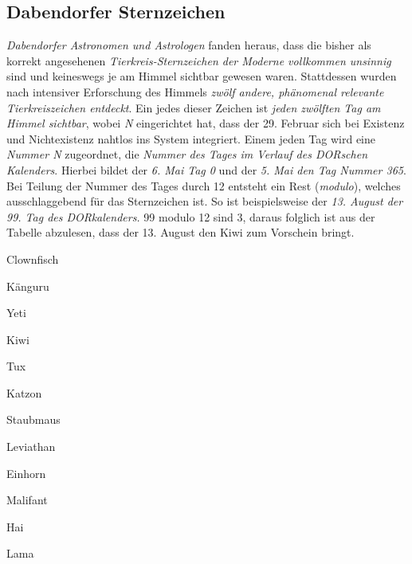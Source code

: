 \subsection{{Dabendorfer Sternzeichen}}
\textit{Dabendorfer Astronomen und Astrologen} fanden heraus, dass die bisher als korrekt angesehenen \textit{Tierkreis-Sternzeichen der Moderne vollkommen unsinnig} sind und keineswegs je am Himmel sichtbar gewesen waren. Stattdessen wurden nach intensiver Erforschung des Himmels \textit{zwölf andere, phänomenal relevante Tierkreiszeichen entdeckt}. Ein jedes dieser Zeichen ist \textit{jeden zwölften Tag am Himmel sichtbar}, wobei \textit{N} eingerichtet hat, dass der 29. Februar sich bei Existenz und Nichtexistenz nahtlos ins System integriert. Einem jeden Tag wird eine \textit{Nummer N} zugeordnet, die \textit{Nummer des Tages im Verlauf des DORschen Kalenders}. Hierbei bildet der \textit{6. Mai Tag 0} und der \textit{5. Mai den Tag Nummer 365}. Bei Teilung der Nummer des Tages durch 12 entsteht ein Rest (\textit{modulo}), welches ausschlaggebend für das Sternzeichen ist. So ist beispielsweise der \textit{13. August der 99. Tag des DORkalenders.} 99 modulo 12 sind 3, daraus folglich ist aus der Tabelle abzulesen, dass der 13. August den Kiwi zum Vorschein bringt.

\begin{enumerate}[start=0]
\begin{multicols}{2}
\begin{spacing}{0.5}
\item Clownfisch
\item Känguru
\item Yeti
\item Kiwi
\item Tux
\item Katzon
\item Staubmaus
\item Leviathan
\item Einhorn
\item Malifant
\item Hai
\item Lama
\end{spacing}
\end{multicols}
\end{enumerate}

